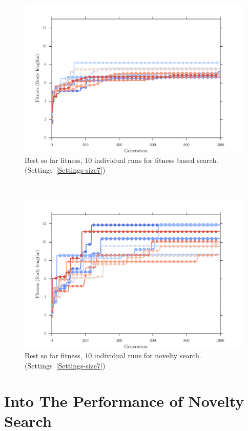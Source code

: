 \begin{figure}[ht!]
\centering
\includegraphics[width=1.0\textwidth]{../Figures/Results/indRunnAvgSize7Fitness.pdf}
\caption{Best so far fitness, $10$ individual runs for fitness based search. (Settings~\ref{Settings-size7})}
\label{fig:indRunsAvgSize10Fitness}
\end{figure}
~
\begin{figure}[ht!]
\centering
\includegraphics[width=1.0\textwidth]{../Figures/Results/indRunnAvgSize7Novelty.pdf}
\caption{Best so far fitness, $10$ individual runs for novelty search. (Settings~\ref{Settings-size7})}
\label{fig:indRunnAvgSize10Novelty}
\end{figure}

\section{Into The Performance of Novelty Search}

